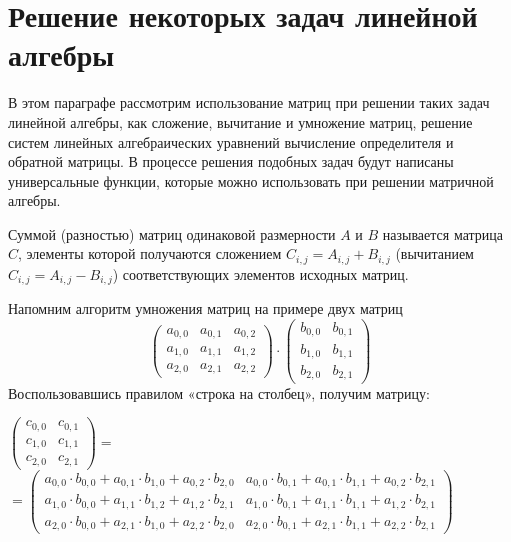 \section[Решение некоторых задач линейной алгебры]{Решение некоторых задач линейной алгебры}
В этом параграфе рассмотрим использование матриц при решении таких задач линейной алгебры, как сложение, вычитание и
умножение матриц, решение систем линейных алгебраических уравнений вычисление определителя и обратной матрицы. В
процессе решения подобных задач будут написаны универсальные функции, которые можно использовать при решении матричной
алгебры.


Суммой (разностью) матриц одинаковой размерности $A$ и $B$ называется матрица $C$, элементы которой получаются сложением 
$C_{i,j}=A_{i,j}+B_{i,j}$ (вычитанием  $C_{i,j}=A_{i,j}-B_{i,j}$) соответствующих элементов исходных матриц. 

Напомним алгоритм умножения матриц на примере двух матриц 
$$\left(\begin{matrix}a_{0,0}&a_{0,1}&a_{0,2}\\a_{1,0}&a_{1,1}&a_{1,2}\\a_{2,0}&a_{2,1}&a_{2,2}\end{matrix}\right)\cdot
\left(\begin{matrix}b_{0,0}&b_{0,1}\\b_{1,0}&b_{1,1}\\b_{2,0}&b_{2,1}\end{matrix}\right)$$ 
Воспользовавшись правилом «строка на столбец», получим матрицу: 

{\noindent%
$\left(\begin{matrix}c_{0,0}&c_{0,1}\\c_{1,0}&c_{1,1}\\c_{2,0}&c_{2,1}\end{matrix}\right)=$\\
$=\left(\begin{matrix}a_{0,0}\cdot
b_{0,0}+a_{0,1}\cdot b_{1,0}+a_{0,2}\cdot b_{2,0}&a_{0,0}\cdot b_{0,1}+a_{0,1}\cdot b_{1,1}+a_{0,2}\cdot
b_{2,1}\\a_{1,0}\cdot b_{0,0}+a_{1,1}\cdot b_{1,2}+a_{1,2}\cdot b_{2,1}&a_{1,0}\cdot b_{0,1}+a_{1,1}\cdot
b_{1,1}+a_{1,2}\cdot b_{2,1}\\a_{2,0}\cdot b_{0,0}+a_{2,1}\cdot b_{1,0}+a_{2,2}\cdot b_{2,0}&a_{2,0}\cdot
b_{0,1}+a_{2,1}\cdot b_{1,1}+a_{2,2}\cdot b_{2,1}\end{matrix}\right)$
}


